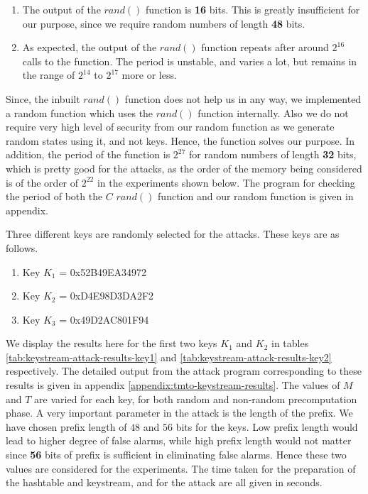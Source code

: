 \begin{enumerate}
\item The output of the $rand()$ function is \textbf{16} bits. This is greatly insufficient for our purpose, since we require random numbers of length \textbf{48} bits. 
\item As expected, the output of the $rand()$ function repeats after around $2^{16}$ calls to the function. The period is unstable, and varies a lot, but remains in the range of $2^{14}$ to $2^{17}$ more or less.
\end{enumerate}

Since, the inbuilt $rand()$ function does not help us in any way, we implemented a random function which uses the $rand()$ function internally. Also we do not require very high level of security from our random function as we generate random states using it, and not keys. Hence, the function solves our purpose. In addition, the period of the function is $2^{27}$ for random numbers of length \textbf{32} bits, which is pretty good for the attacks, as the order of the memory being considered is of the order of $2^{22}$ in the experiments shown below. The program for checking the period of both the $C$ $rand()$ function and our random function is given in appendix.

Three different keys are randomly selected for the attacks. These keys are as follows.

\begin{enumerate}
\item Key $K_1$ = 0x52B49EA34972
\item Key $K_2$ = 0xD4E98D3DA2F2
\item Key $K_3$ = 0x49D2AC801F94
\end{enumerate}

We display the results here for the first two keys $K_1$ and $K_2$ in tables \ref{tab:keystream-attack-results-key1} and \ref{tab:keystream-attack-results-key2} respectively. The detailed output from the attack program corresponding to these results is given in appendix \ref{appendix:tmto-keystream-results}. The values of $M$ and $T$ are varied for each key, for both random and non-random precomputation phase. A very important parameter in the attack is the length of the prefix. We have chosen prefix length of $48$ and $56$ bits for the keys. Low prefix length would lead to higher degree of false alarms, while high prefix length would not matter since \textbf{56} bits of prefix is sufficient in eliminating false alarms. Hence these two values are considered for the experiments. The time taken for the preparation of the hashtable and keystream, and for the attack are all given in seconds. 


